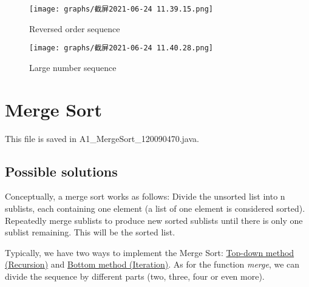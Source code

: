 \documentclass{article}
\begin{document}


        \begin{figure}[h]
            \begin{minipage}{0.5\linewidth}
              \centering
              \texttt{[image: graphs/截屏2021-06-24 11.39.15.png]}
              \caption{Reversed order sequence}
            \end{minipage}
            \begin{minipage}{0.5\linewidth}
              \centering
              \texttt{[image: graphs/截屏2021-06-24 11.40.28.png]}
              \caption{Large number sequence}
            \end{minipage}
        \end{figure}
\vspace{5cm}

\section{Merge Sort}
    \noindent This file is saved in A1\_MergeSort\_120090470.java. 

    \subsection{Possible solutions}
    Conceptually, a merge sort works as follows:
    Divide the unsorted list into n sublists, each containing one element (a list of one element is considered sorted).
    Repeatedly merge sublists to produce new sorted sublists until there is only one sublist remaining. This will be the sorted list. \par
    Typically, we have two ways to implement the Merge Sort: \underline{Top-down method (Recursion)} and \underline{Bottom method (Iteration)}.
    As for the function \textit{merge}, we can divide the sequence by different parts (two, three, four or even more).
\end{document}
